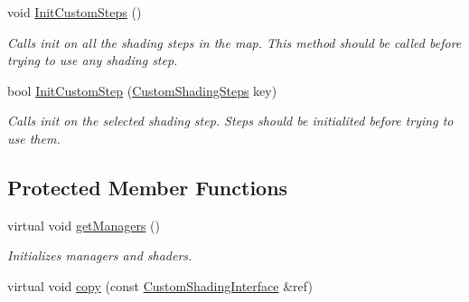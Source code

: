 \begin{DoxyCompactItemize}
void \mbox{\hyperlink{class_geometry_engine_1_1_custom_shading_1_1_custom_shading_interface_a33f156385620cc991853573bbb8cb1a0}{Init\+Custom\+Steps}} ()
\begin{DoxyCompactList}\small\item\em Calls init on all the shading steps in the map. This method should be called before trying to use any shading step. \end{DoxyCompactList}\item 
\mbox{\label{class_geometry_engine_1_1_custom_shading_1_1_custom_shading_interface_aff189b50a22650a19eba44b96eb62b1f}} 
bool \mbox{\hyperlink{class_geometry_engine_1_1_custom_shading_1_1_custom_shading_interface_aff189b50a22650a19eba44b96eb62b1f}{Init\+Custom\+Step}} (\mbox{\hyperlink{namespace_geometry_engine_1_1_custom_shading_a2dc236a5b567da5099069ce2b2be5609}{Custom\+Shading\+Steps}} key)
\begin{DoxyCompactList}\small\item\em Calls init on the selected shading step. Steps should be initialited before trying to use them. \end{DoxyCompactList}\end{DoxyCompactItemize}
\subsection*{Protected Member Functions}
\begin{DoxyCompactItemize}
\item 
\mbox{\label{class_geometry_engine_1_1_custom_shading_1_1_custom_shading_interface_a337c599d79465f95890b3e6b2ed58d00}} 
virtual void \mbox{\hyperlink{class_geometry_engine_1_1_custom_shading_1_1_custom_shading_interface_a337c599d79465f95890b3e6b2ed58d00}{get\+Managers}} ()
\begin{DoxyCompactList}\small\item\em Initializes managers and shaders. \end{DoxyCompactList}\item 
virtual void \mbox{\hyperlink{class_geometry_engine_1_1_custom_shading_1_1_custom_shading_interface_a7ecb7c9e61cb2e8f2cca7a4f2f156539}{copy}} (const \mbox{\hyperlink{class_geometry_engine_1_1_custom_shading_1_1_custom_shading_interface}{Custom\+Shading\+Interface}} \&ref)
\end{DoxyCompactItemize}
